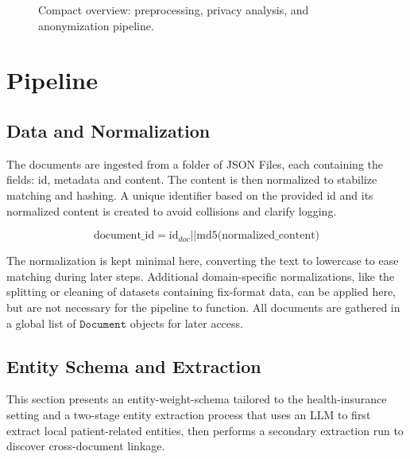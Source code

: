 \begin{figure}[t]
{}
\caption{Compact overview: preprocessing, privacy analysis, and anonymization pipeline.}
\end{figure}

\section{Pipeline}
\subsection{Data and Normalization}
The documents are ingested from a folder of JSON Files, each containing the fields: id, metadata and content. The content is then normalized to stabilize matching and hashing. A unique identifier based on the provided id and its normalized content is created to avoid collisions and clarify logging.

\[\mbox{document\_id} = \mbox{id}_{doc} \vert\vert \mbox{md5(normalized\_content)}\]

The normalization is kept minimal here, converting the text to lowercase to ease matching during later steps. Additional domain-specific normalizations, like the splitting or cleaning of datasets containing fix-format data, can be applied here, but are not necessary for the pipeline to function.
All documents are gathered in a global list of $\texttt{Document}$ objects for later access.

\subsection{Entity Schema and Extraction}
This section presents an entity-weight-schema tailored to the health-insurance setting and a two-stage entity extraction process that uses an LLM to first extract local patient-related entities, then performs a secondary extraction run to discover cross-document linkage.

